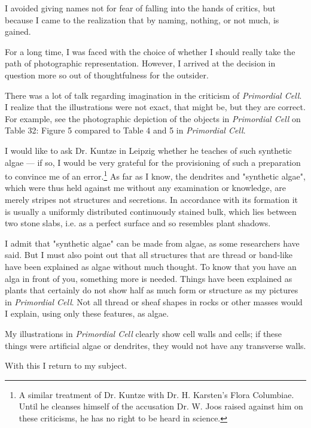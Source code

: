 \documentclass[a4paper, 12pt, oneside]{article}
\begin{document}
I avoided giving names not for fear of falling into the hands of critics, but because I came to the realization that by naming, nothing, or not much, is gained.

For a long time, I was faced with the choice of whether I should really take the path of photographic representation. However, I arrived at the decision in question more so out of thoughtfulness for the outsider.

There was a lot of talk regarding imagination in the criticism of \emph{Primordial Cell}. I realize that the illustrations were not exact, that might be, but they are correct. For example, see the photographic depiction of the objects in \emph{Primordial Cell} on Table 32: Figure 5 compared to Table 4 and 5 in \emph{Primordial Cell}.

I would like to ask Dr. Kuntze in Leipzig whether he teaches of such synthetic algae — if so, I would be very grateful for the provisioning of such a preparation to convince me of an error.\footnote{A similar treatment of Dr. Kuntze with Dr. H. Karsten's Flora Columbiae. Until he cleanses himself of the accusation Dr. W. Joos raised against him on these criticisms, he has no right to be heard in science.} As far as I know, the dendrites and "synthetic algae", which were thus held against me without any examination or knowledge, are merely stripes not structures and secretions. In accordance with its formation it is usually a uniformly distributed continuously stained bulk, which lies between two stone slabs, i.e. as a perfect surface and so resembles plant shadows.

I admit that "synthetic algae" can be made from algae, as some researchers have said. But I must also point out that all structures that are thread or band-like have been explained as algae without much thought. To know that you have an alga in front of you, something more is needed. Things have been explained as plants that certainly do not show half as much form or structure as my pictures in \emph{Primordial Cell}. Not all thread or sheaf shapes in rocks or other masses would I explain, using only these features, as algae.

My illustrations in \emph{Primordial Cell} clearly show cell walls and cells; if these things were artificial algae or dendrites, they would not have any transverse walls.

With this I return to my subject.
\end{document}

